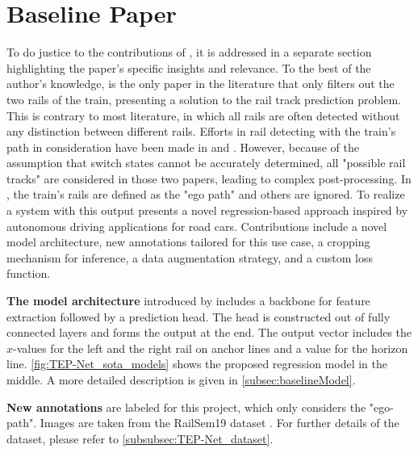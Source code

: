 \section{Baseline Paper}
\label{sec:baselinepaper}

To do justice to the contributions of \cite{tepNet2024}, it is addressed in a separate section highlighting the paper's specific insights and relevance. 
To the best of the author's knowledge, \cite{tepNet2024} is the only paper in the literature that only filters out the two rails of the train, presenting a solution to the rail track prediction problem.
This is contrary to most literature, in which all rails are often detected without any distinction between different rails.
Efforts in rail detecting with the train's path in consideration have been made in \cite{RailraodSemanticPossibleTracks2020} and \cite{TPENet2023}.
However, because of the assumption that switch states cannot be accurately determined, all "possible rail tracks" are considered in those two papers, leading to complex post-processing.
In \cite{tepNet2024}, the train's rails are defined as the "ego path" and others are ignored.
To realize a system with this output \cite{tepNet2024} presents a novel regression-based approach inspired by autonomous driving applications for road cars.
Contributions include a novel model architecture, new annotations tailored for this use case, a cropping mechanism for inference, a data augmentation strategy, and a custom loss function.

\vspace{0.7cm} %

\noindent \textbf{The model architecture} introduced by \cite{tepNet2024} includes a backbone for feature extraction followed by a prediction head.
The head is constructed out of fully connected layers and forms the output at the end.
The output vector includes the $x$-values for the left and the right rail on anchor lines and a value for the horizon line.
\autoref{fig:TEP-Net_sota_models} shows the proposed regression model in the middle.
A more detailed description is given in \autoref{subsec:baselineModel}.

\vspace{0.7cm} %

\noindent \textbf{New annotations} are labeled for this project, which only considers the "ego-path".
Images are taken from the RailSem19 dataset \cite{tepNet2024}.
For further details of the dataset, please refer to \autoref{subsubsec:TEP-Net_dataset}.

